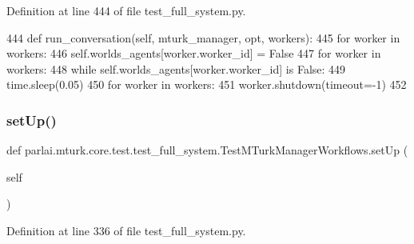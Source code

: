 Definition at line 444 of file test\+\_\+full\+\_\+system.\+py.


\begin{DoxyCode}
444     \textcolor{keyword}{def }run\_conversation(self, mturk\_manager, opt, workers):
445         \textcolor{keywordflow}{for} worker \textcolor{keywordflow}{in} workers:
446             self.worlds\_agents[worker.worker\_id] = \textcolor{keyword}{False}
447         \textcolor{keywordflow}{for} worker \textcolor{keywordflow}{in} workers:
448             \textcolor{keywordflow}{while} self.worlds\_agents[worker.worker\_id] \textcolor{keywordflow}{is} \textcolor{keyword}{False}:
449                 time.sleep(0.05)
450         \textcolor{keywordflow}{for} worker \textcolor{keywordflow}{in} workers:
451             worker.shutdown(timeout=-1)
452 
\end{DoxyCode}
\mbox{\label{classparlai_1_1mturk_1_1core_1_1test_1_1test__full__system_1_1TestMTurkManagerWorkflows_a62baf9564be3f57380e5ac503c1ccd3c}} 
\subsubsection{\texorpdfstring{set\+Up()}{setUp()}}
{\footnotesize\ttfamily def parlai.\+mturk.\+core.\+test.\+test\+\_\+full\+\_\+system.\+Test\+M\+Turk\+Manager\+Workflows.\+set\+Up (\begin{DoxyParamCaption}\item[{}]{self }\end{DoxyParamCaption})}



Definition at line 336 of file test\+\_\+full\+\_\+system.\+py.



